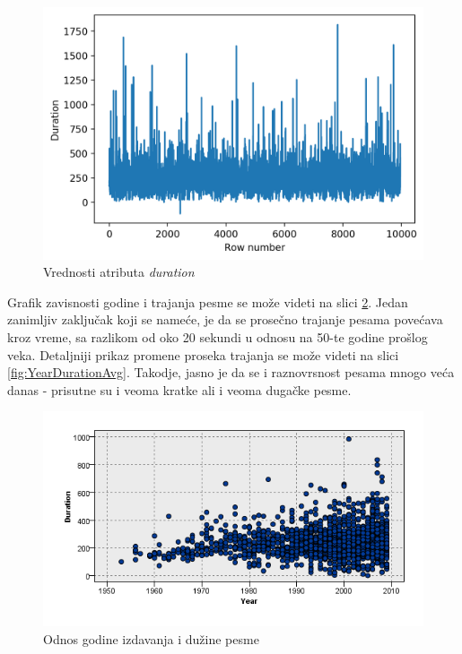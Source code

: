 \begin{figure}[H]
    \centering
    \includegraphics[scale=0.7]{resources/duration.png}
    \caption{Vrednosti atributa \emph{duration}}
    \label{fig:duration}
\end{figure}

Grafik zavisnosti godine i trajanja pesme se mo\v{z}e videti na slici \ref{fig:YearDuration}. Jedan zanimljiv zaklju\v{c}ak koji se name\'c{}e, je da se prose\v{c}no trajanje pesama pove\'c{}ava kroz vreme, sa razlikom od oko 20 sekundi u odnosu na 50-te godine pro\v{s}log veka. Detaljniji prikaz promene proseka trajanja se mo\v{z}e videti na slici \ref{fig:YearDurationAvg}. Takodje, jasno je da se i raznovrsnost pesama mnogo ve\'c{}a danas - prisutne su i veoma kratke ali i veoma duga\v{c}ke pesme.


\begin{figure}[H]
    \centering
    \includegraphics[scale=0.6]{resources/year-duration.png}
    \caption{Odnos godine izdavanja i du\v{z}ine pesme}
    \label{fig:YearDuration}
\end{figure}

